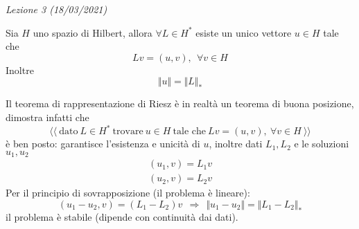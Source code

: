 \documentclass[10pt,a4paper,twoside,openright]{book}
\begin{document}
\textit{Lezione 3 (18/03/2021)}
\begin{theorem}
 Sia $H$ uno spazio di Hilbert, allora $\forall L\in H^{*}$ esiste un unico vettore $u\in H$ tale che
\begin{equation*}
Lv=(u,v),\ \ \forall v\in H
\end{equation*}
Inoltre
\begin{equation*}
\Vert u\Vert =\Vert L\Vert _{*}
\end{equation*}
\end{theorem}
\begin{oss}
Il teorema di rappresentazione di Riesz è in realtà un teorema di buona posizione, dimostra infatti che
\begin{equation*}
\langle\langle \ \text{dato} \ L\in H^{*} \ \text{trovare} \ u\in H\ \text{tale che} \ Lv=(u,v),\ \forall v\in H\ \rangle\rangle 
\end{equation*}
è ben posto: garantisce l'esistenza e unicità di $\displaystyle u$, inoltre dati $\displaystyle L_{1},L_{2}$ e le soluzioni $\displaystyle u_{1},u_{2}$
\begin{gather*}
(u_{1},v) =L_{1} v\\
(u_{2},v) =L_{2} v
\end{gather*}
Per il principio di sovrapposizione (il problema è lineare):
\begin{equation*}
(u_{1} -u_{2},v) =(L_{1} -L_{2}) v\ \ \Rightarrow \ \ \Vert u_{1} -u_{2}\Vert =\Vert L_{1} -L_{2}\Vert _{*}
\end{equation*}
il problema è stabile (dipende con continuità dai dati).
\end{oss}
\end{document}

